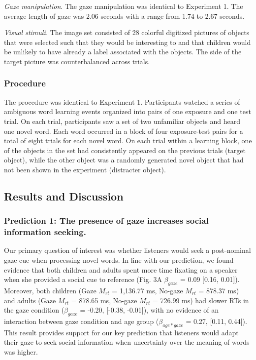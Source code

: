 \documentclass[10pt, letterpaper]{article}
\begin{document}
\emph{Gaze manipulation}. The gaze manipulation was identical to
Experiment 1. The average length of gaze was 2.06 seconds with a range
from 1.74 to 2.67 seconds.

\emph{Visual stimuli.} The image set consisted of 28 colorful digitized
pictures of objects that were selected such that they would be
interesting to and that children would be unlikely to have already a
label associated with the objects. The side of the target picture was
counterbalanced across trials.

\hypertarget{procedure-1}{%
\subsubsection{Procedure}\label{procedure-1}}

The procedure was identical to Experiment 1. Participants watched a
series of ambiguous word learning events organized into pairs of one
exposure and one test trial. On each trial, participants saw a set of
two unfamiliar objects and heard one novel word. Each word occurred in a
block of four exposure-test pairs for a total of eight trials for each
novel word. On each trial within a learning block, one of the objects in
the set had consistently appeared on the previous trials (target
object), while the other object was a randomly generated novel object
that had not been shown in the experiment (distracter object).

\hypertarget{results-and-discussion-1}{%
\subsection{Results and Discussion}\label{results-and-discussion-1}}

\hypertarget{prediction-1-the-presence-of-gaze-increases-social-information-seeking.}{%
\subsubsection{Prediction 1: The presence of gaze increases social
information
seeking.}\label{prediction-1-the-presence-of-gaze-increases-social-information-seeking.}}

Our primary question of interest was whether listeners would seek a
post-nominal gaze cue when processing novel words. In line with our
prediction, we found evidence that both children and adults spent more
time fixating on a speaker when she provided a social cue to reference
(Fig. 3A \(\beta_{gaze}\) = 0.09 {[}0.16, 0.01{]}). Moreover, both
children (Gaze \(M_{rt}\) = 1,136.77 ms, No-gaze \(M_{rt}\) = 878.37 ms)
and adults (Gaze \(M_{rt}\) = 878.65 ms, No-gaze \(M_{rt}\) = 726.99 ms)
had slower RTs in the gaze condition (\(\beta_{gaze}\) = -0.20,
{[}-0.38, -0.01{]}), with no evidence of an interaction between gaze
condition and age group (\(\beta_{age*gaze}\) = 0.27, {[}0.11, 0.44{]}).
This result provides support for our key prediction that listeners would
adapt their gaze to seek social information when uncertainty over the
meaning of words was higher.
\end{document}
